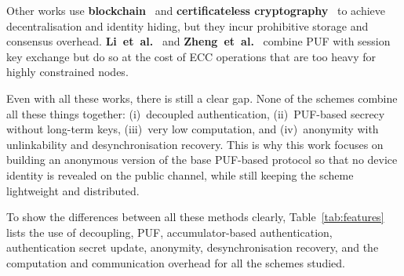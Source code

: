 \documentclass[12pt,a4paper]{report}
\begin{document}
Other works use \textbf{blockchain}~\cite{ahmed2023chains} and
\textbf{certificateless cryptography}~\cite{alriyami2003cert} to achieve
decentralisation and identity hiding, but they incur prohibitive storage and consensus
overhead.
\textbf{Li~et~al.}~\cite{li2020puf} and \textbf{Zheng~et~al.}~\cite{zheng2022puf}
combine PUF with session key exchange but do so at the cost of ECC operations that
are too heavy for highly constrained nodes.

Even with all these works, there is still a clear gap.
None of the schemes combine all these things together: (i)~decoupled authentication,
(ii)~PUF-based secrecy without long-term keys, (iii)~very low computation, and
(iv)~anonymity with unlinkability and desynchronisation recovery.
This is why this work focuses on building an anonymous version of the base PUF-based
protocol so that no device identity is revealed on the public channel, while still
keeping the scheme lightweight and distributed.

To show the differences between all these methods clearly, Table~\ref{tab:features}
lists the use of decoupling, PUF, accumulator-based authentication, authentication
secret update, anonymity, desynchronisation recovery, and the computation and
communication overhead for all the schemes studied.
\end{document}
